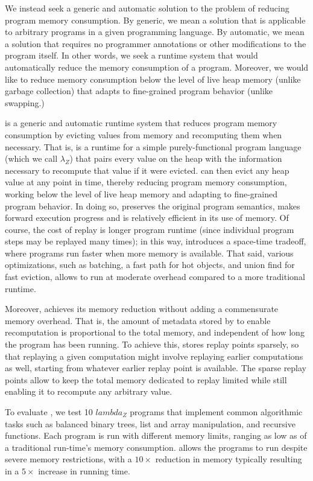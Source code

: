 We instead seek a generic and automatic solution to the problem
  of reducing program memory consumption.
By generic, we mean a solution
  that is applicable to arbitrary programs
  in a given programming language.
By automatic, we mean a solution
  that requires no programmer annotations
  or other modifications to the program itself.
In other words, we seek a runtime system
  that would automatically reduce the memory consumption
  of a program.
Moreover, we would like to reduce memory consumption
  below the level of live heap memory
  (unlike garbage collection)
  that adapts to fine-grained program behavior
  (unlike swapping.)

\name is a generic and automatic runtime system
  that reduces program memory consumption
  by evicting values from memory
  and recomputing them when necessary.
That is, \name is a runtime
  for a simple purely-functional program language
  (which we call $\lambda_Z$)
  that pairs every value on the heap
  with the information necessary
  to recompute that value if it were evicted.
\name can then evict any heap value
  at any point in time,
  thereby reducing program memory consumption,
  working below the level of live heap memory
  and adapting to fine-grained program behavior.
In doing so,
  \name preserves the original program semantics,
  makes forward execution progress
  and is relatively efficient in its use of memory.
Of course, the cost of replay
  is longer program runtime
  (since individual program steps may be replayed many times);
  in this way, \name introduces a space-time tradeoff,
  where programs run faster when more memory is available.
That said, various optimizations,
  such as batching, a fast path for hot objects,
  and union find for fast eviction,
  allows \name to run at moderate overhead
  compared to a more traditional runtime.

Moreover, \name achieves its memory reduction
  without adding a commensurate memory overhead.
That is, the amount of metadata stored by \name
  to enable recomputation
  is proportional to the total memory,
  and independent of how long the program has been running.
To achieve this,
  \name stores replay points sparsely,
  so that replaying a given computation
  might involve replaying earlier computations as well,
  starting from whatever earlier replay point is available.
The sparse replay points
  allow \name to keep the total memory dedicated to replay limited
  while still enabling it to recompute any arbitrary value.

To evaluate \name,
  we test 10 $lambda_Z$ programs
  that implement common algorithmic tasks
  such as balanced binary trees, list and array manipulation,
  and recursive functions.
Each program is run with different memory limits,
  ranging as low as 
  of a traditional run-time's memory consumption.
\name allows the programs to run
  despite severe memory restrictions,
  with a $10\times$ reduction in memory
  typically resulting in a $5\times$ increase in running time.

